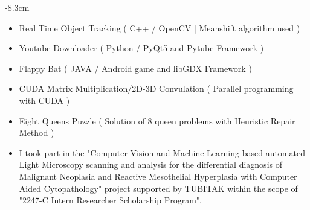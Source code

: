 \documentclass[10pt,a4paper]{altacv}
\begin{document}
\begin{adjustwidth}{}{-8.3cm}
\begin{itemize}
    \item Real Time Object Tracking ( C++ / OpenCV | Meanshift algorithm used )
    \item Youtube Downloader ( Python / PyQt5 and Pytube Framework )
    \item Flappy Bat ( JAVA / Android game and libGDX Framework )
    \item CUDA Matrix Multiplication/2D-3D Convulation ( Parallel programming with CUDA )
    \item Eight Queens Puzzle ( Solution of 8 queen problems with Heuristic Repair Method )
\end{itemize}


\smallskip

\begin{itemize}
    \item I took part in the "Computer Vision and Machine Learning based automated Light Microscopy scanning and analysis for the differential diagnosis of Malignant Neoplasia and Reactive Mesothelial Hyperplasia with Computer Aided Cytopathology" project supported by TUBITAK within the scope of "2247-C Intern Researcher Scholarship Program".
\end{itemize}


\end{adjustwidth}
\end{document}
